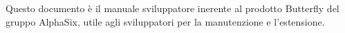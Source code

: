 Questo documento è il manuale sviluppatore inerente al prodotto Butterfly del gruppo AlphaSix, utile
agli sviluppatori per la manutenzione e l'estensione.
